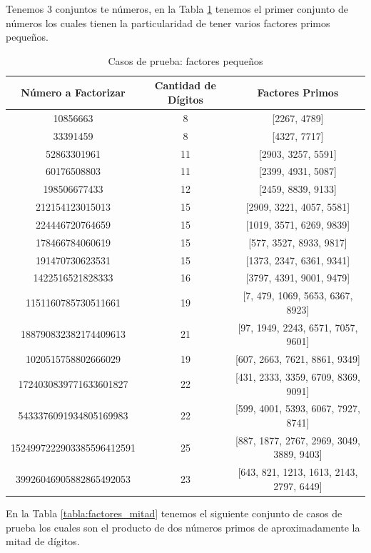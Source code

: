 Tenemos 3 conjuntos te números, en la Tabla \ref{tabla:factores_pequeños} tenemos el primer conjunto de números los cuales tienen la particularidad de tener varios factores primos pequeños.

\begin{table}[H]
    \begin{adjustbox}{width=\columnwidth,center}
    \centering
    \begin{tabular}{|c|c|c|}
    \hline
    Número a Factorizar & Cantidad de Dígitos & Factores Primos \\
    \hline
    10856663 & 8 & [2267, 4789] \\
33391459 & 8 & [4327, 7717] \\
52863301961 & 11 & [2903, 3257, 5591] \\
60176508803 & 11 & [2399, 4931, 5087] \\
198506677433 & 12 & [2459, 8839, 9133] \\
212154123015013 & 15 & [2909, 3221, 4057, 5581] \\
224446720764659 & 15 & [1019, 3571, 6269, 9839] \\
178466784060619 & 15 & [577, 3527, 8933, 9817] \\
191470730623531 & 15 & [1373, 2347, 6361, 9341] \\
1422516521828333 & 16 & [3797, 4391, 9001, 9479] \\
1151160785730511661 & 19 & [7, 479, 1069, 5653, 6367, 8923] \\
188790832382174409613 & 21 & [97, 1949, 2243, 6571, 7057, 9601] \\
1020515758802666029 & 19 & [607, 2663, 7621, 8861, 9349] \\
1724030839771633601827 & 22 & [431, 2333, 3359, 6709, 8369, 9091] \\
5433376091934805169983 & 22 & [599, 4001, 5393, 6067, 7927, 8741] \\
1524997222903385596412591 & 25 & [887, 1877, 2767, 2969, 3049, 3889, 9403] \\
39926046905882865492053 & 23 & [643, 821, 1213, 1613, 2143, 2797, 6449] \\
    \hline
    \end{tabular}
\end{adjustbox}
    \caption{Casos de prueba: factores pequeños}
    \label{tabla:factores_pequeños}
    

\end{table}
    

En la Tabla \ref{tabla:factores_mitad} tenemos el siguiente conjunto de casos de prueba los cuales son el producto de dos números primos de aproximadamente la mitad de dígitos.

